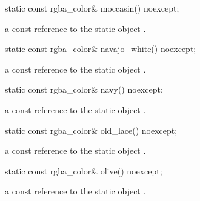 \begin{itemdecl}
    static const rgba_color& moccasin() noexcept;
\end{itemdecl}
\begin{itemdescr}
    \pnum
    \returns
    a const reference to the static  object .
\end{itemdescr}

\begin{itemdecl}
    static const rgba_color& navajo_white() noexcept;
\end{itemdecl}
\begin{itemdescr}
    \pnum
    \returns
    a const reference to the static  object .
\end{itemdescr}

\begin{itemdecl}
    static const rgba_color& navy() noexcept;
\end{itemdecl}
\begin{itemdescr}
    \pnum
    \returns
    a const reference to the static  object .
\end{itemdescr}

\begin{itemdecl}
    static const rgba_color& old_lace() noexcept;
\end{itemdecl}
\begin{itemdescr}
    \pnum
    \returns
    a const reference to the static  object .
\end{itemdescr}

\begin{itemdecl}
    static const rgba_color& olive() noexcept;
\end{itemdecl}
\begin{itemdescr}
    \pnum
    \returns
    a const reference to the static  object .
\end{itemdescr}

